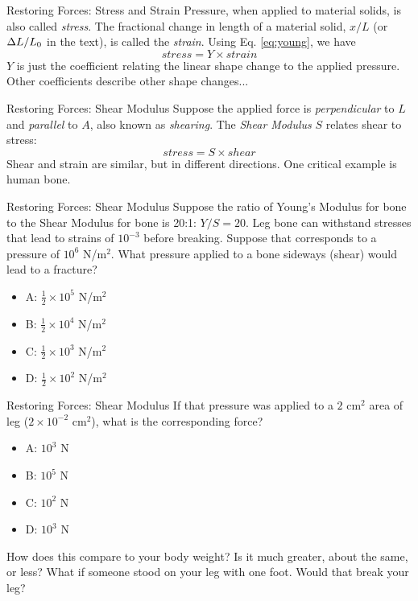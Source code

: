 \documentclass{beamer}
\begin{document}
\begin{frame}{Restoring Forces: Stress and Strain}
Pressure, when applied to material solids, is also called \textit{stress}.  The fractional change in length of a material solid, $x/L$ (or $\Delta L/L_{\rm 0}$ in the text), is called the \textit{strain}.  Using Eq. \ref{eq:young}, we have
\begin{equation}
stress = Y \times strain
\end{equation}
$Y$ is just the coefficient relating the linear shape change to the applied pressure.  Other coefficients describe other shape changes...
\end{frame}

\begin{frame}{Restoring Forces: Shear Modulus}
Suppose the applied force is \textit{perpendicular} to $L$ and \textit{parallel} to $A$, also known as \textit{shearing}.  The \textit{Shear Modulus} $S$ relates shear to stress: \\
\begin{equation}
stress = S \times shear
\end{equation}
Shear and strain are similar, but in different directions.  One critical example is human bone.
\end{frame}

\begin{frame}{Restoring Forces: Shear Modulus}
Suppose the ratio of Young's Modulus for bone to the Shear Modulus for bone is 20:1: $Y/S = 20$.  Leg bone can withstand stresses that lead to strains of $10^{-3}$ before breaking.  Suppose that corresponds to a pressure of $10^6$ N/m$^2$.  What pressure applied to a bone sideways (shear) would lead to a fracture?
\begin{itemize}
\item A: $\frac{1}{2} \times 10^{5}$ N/m$^2$
\item B: $\frac{1}{2} \times 10^{4}$ N/m$^2$
\item C: $\frac{1}{2} \times 10^{3}$ N/m$^2$
\item D: $\frac{1}{2} \times 10^{2}$ N/m$^2$
\end{itemize}
\end{frame}

\begin{frame}{Restoring Forces: Shear Modulus}
If that pressure was applied to a $2$ cm$^2$ area of leg ($2 \times 10^{-2}$ cm$^2$), what is the corresponding force?
\begin{itemize}
\item A: $10^{3}$ N
\item B: $10^{5}$ N
\item C: $10^{2}$ N
\item D: $10^{3}$ N
\end{itemize}
How does this compare to your body weight? Is it much greater, about the same, or less?  What if someone stood on your leg with one foot.  Would that break your leg?
\end{frame}
\end{document}
